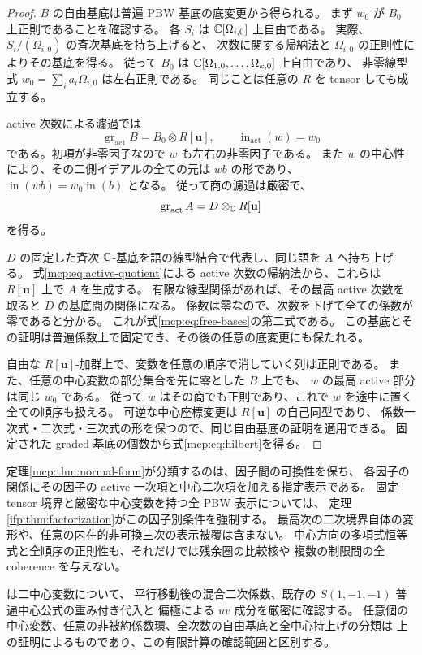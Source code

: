 \begin{proof}
$B$ の自由基底は普遍 PBW 基底の底変更から得られる。
まず $w_0$ が $B_0$ 上正則であることを確認する。
各 $S_i$ は $\mathbb C[\Omega_{i,0}]$ 上自由である。
実際、$S_i/(\Omega_{i,0})$ の斉次基底を持ち上げると、
次数に関する帰納法と $\Omega_{i,0}$ の正則性によりその基底を得る。
従って $B_0$ は $\mathbb C[\Omega_{1,0},\ldots,\Omega_{k,0}]$ 上自由であり、
非零線型式 $w_0=\sum_i a_i\Omega_{i,0}$ は左右正則である。
同じことは任意の $R$ を tensor しても成立する。

active 次数による濾過では
\[
      \operatorname{gr}_{\mathrm{act}}B=B_0\otimes R[\mathbf u],
         \qquad \operatorname{in}_{\mathrm{act}}(w)=w_0
\]
である。初項が非零因子なので $w$ も左右の非零因子である。
また $w$ の中心性により、その二側イデアルの全ての元は $wb$ の形であり、
$\operatorname{in}(wb)=w_0\operatorname{in}(b)$ となる。
従って商の濾過は厳密で、
\begin{equation}\label{mcp:eq:active-quotient}
           \operatorname{gr}_{\mathrm{act}}A
                 =D\otimes_{\mathbb C}R[\mathbf u]
\end{equation}
を得る。

$D$ の固定した斉次 $\mathbb C$-基底を語の線型結合で代表し、同じ語を $A$ へ持ち上げる。
式\eqref{mcp:eq:active-quotient}による active 次数の帰納法から、これらは
$R[\mathbf u]$ 上で $A$ を生成する。
有限な線型関係があれば、その最高 active 次数を取ると $D$ の基底間の関係になる。
係数は零なので、次数を下げて全ての係数が零であると分かる。
これが式\eqref{mcp:eq:free-bases}の第二式である。
この基底とその証明は普遍係数上で固定でき、その後の任意の底変更にも保たれる。

自由な $R[\mathbf u]$-加群上で、変数を任意の順序で消していく列は正則である。
また、任意の中心変数の部分集合を先に零とした $B$ 上でも、
$w$ の最高 active 部分は同じ $w_0$ である。
従って $w$ はその商でも正則であり、これで $w$ を途中に置く全ての順序も扱える。
可逆な中心座標変更は $R[\mathbf u]$ の自己同型であり、
係数一次式・二次式・三次式の形を保つので、同じ自由基底の証明を適用できる。
固定された graded 基底の個数から式\eqref{mcp:eq:hilbert}を得る。
\end{proof}

\begin{remark}[被覆の範囲と検算]
\label{mcp:rem:scope}
定理\ref{mcp:thm:normal-form}が分類するのは、因子間の可換性を保ち、
各因子の関係にその因子の active 一次項と中心二次項を加える指定表示である。
固定 tensor 境界と厳密な中心変数を持つ全 PBW 表示については、
定理\ref{ifp:thm:factorization}がこの因子別条件を強制する。
最高次の二次境界自体の変形や、任意の内在的非可換三次の表示被覆は含まない。
中心方向の多項式恒等式と全順序の正則性も、それだけでは残余圏の比較核や
複数の制限間の全 coherence を与えない。

 は二中心変数について、
平行移動後の混合二次係数、既存の $S(1,-1,-1)$ 普遍中心公式の重み付き代入と
偏極による $uv$ 成分を厳密に確認する。
任意個の中心変数、任意の非被約係数環、全次数の自由基底と全中心持上げの分類は
上の証明によるものであり、この有限計算の確認範囲と区別する。
\end{remark}
